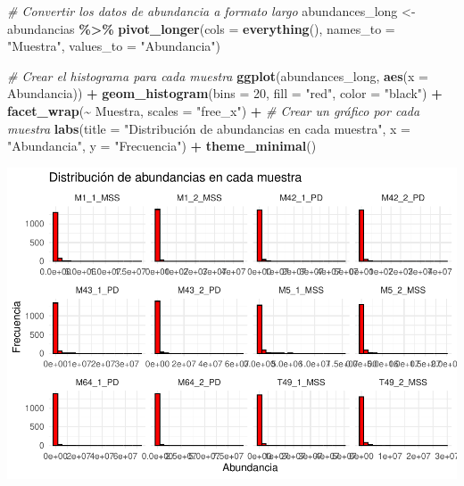 \documentclass[
]{article}
\newenvironment{Shaded}{\begin{snugshade}}{\end{snugshade}}
\newcommand{\AttributeTok}[1]{\textcolor[rgb]{0.13,0.29,0.53}{#1}}
\newcommand{\CommentTok}[1]{\textcolor[rgb]{0.56,0.35,0.01}{\textit{#1}}}
\newcommand{\DecValTok}[1]{\textcolor[rgb]{0.00,0.00,0.81}{#1}}
\newcommand{\FunctionTok}[1]{\textcolor[rgb]{0.13,0.29,0.53}{\textbf{#1}}}
\newcommand{\NormalTok}[1]{#1}
\newcommand{\OtherTok}[1]{\textcolor[rgb]{0.56,0.35,0.01}{#1}}
\newcommand{\SpecialCharTok}[1]{\textcolor[rgb]{0.81,0.36,0.00}{\textbf{#1}}}
\newcommand{\StringTok}[1]{\textcolor[rgb]{0.31,0.60,0.02}{#1}}
\begin{document}
\begin{Shaded}
\begin{Highlighting}[]
\CommentTok{\# Convertir los datos de abundancia a formato largo}
\NormalTok{abundances\_long }\OtherTok{\textless{}{-}}\NormalTok{ abundancias }\SpecialCharTok{\%\textgreater{}\%} 
  \FunctionTok{pivot\_longer}\NormalTok{(}\AttributeTok{cols =} \FunctionTok{everything}\NormalTok{(), }\AttributeTok{names\_to =} \StringTok{"Muestra"}\NormalTok{, }\AttributeTok{values\_to =} \StringTok{"Abundancia"}\NormalTok{)}

\CommentTok{\# Crear el histograma para cada muestra}
\FunctionTok{ggplot}\NormalTok{(abundances\_long, }\FunctionTok{aes}\NormalTok{(}\AttributeTok{x =}\NormalTok{ Abundancia)) }\SpecialCharTok{+}
  \FunctionTok{geom\_histogram}\NormalTok{(}\AttributeTok{bins =} \DecValTok{20}\NormalTok{, }\AttributeTok{fill =} \StringTok{"red"}\NormalTok{, }\AttributeTok{color =} \StringTok{"black"}\NormalTok{) }\SpecialCharTok{+}
  \FunctionTok{facet\_wrap}\NormalTok{(}\SpecialCharTok{\textasciitilde{}}\NormalTok{ Muestra, }\AttributeTok{scales =} \StringTok{"free\_x"}\NormalTok{) }\SpecialCharTok{+}  \CommentTok{\# Crear un gráfico por cada muestra}
  \FunctionTok{labs}\NormalTok{(}\AttributeTok{title =} \StringTok{"Distribución de abundancias en cada muestra"}\NormalTok{,}
       \AttributeTok{x =} \StringTok{"Abundancia"}\NormalTok{,}
       \AttributeTok{y =} \StringTok{"Frecuencia"}\NormalTok{) }\SpecialCharTok{+}
  \FunctionTok{theme\_minimal}\NormalTok{()}
\end{Highlighting}
\end{Shaded}

\includegraphics{Manzano-Reche-Gabriel-PEC1_files/figure-latex/unnamed-chunk-10-1.pdf}
\end{document}
